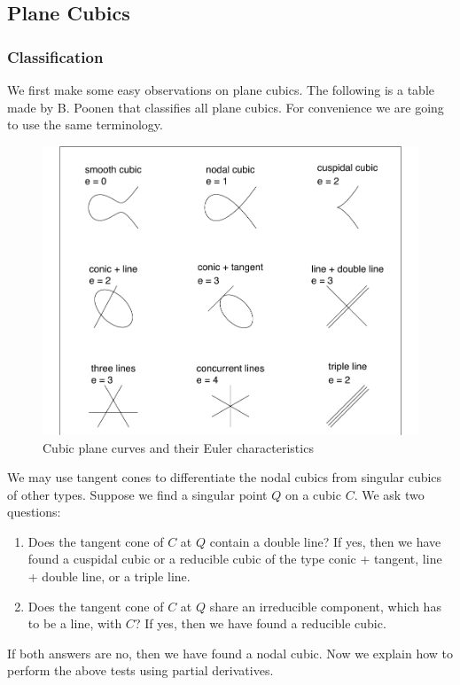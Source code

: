 \documentclass[12pt]{article}
\theoremstyle{plain}
\theoremstyle{definition}
\newcommand{\<}{\langle}
\renewcommand{\>}{\rangle}
\begin{document}
\subsection{Plane Cubics}
\subsubsection{Classification}
\label{classification}
We first make some easy observations on plane cubics. The following is a table made by B. Poonen that classifies all plane cubics. For convenience we are going to use the same terminology.

\begin{figure}[h!]
  \label{figure}
  \centering
      \includegraphics[width=1.0\textwidth]{planecubics}
  \caption{Cubic plane curves and their Euler characteristics \cite{Pic}}
\end{figure}

We may use tangent cones to differentiate the nodal cubics from singular cubics of other types. Suppose we find a singular point $Q$ on a cubic $C$. We ask two questions:
\begin{enumerate}
\item Does the tangent cone of $C$ at $Q$ contain a double line? If yes, then we have found a cuspidal cubic or a reducible cubic of the type conic + tangent, line + double line, or a triple line. 
\item Does the tangent cone of $C$ at $Q$ share an irreducible component, which has to be a line, with $C$? If yes, then we have found a reducible cubic. 
\end{enumerate}
If both answers are no, then we have found a nodal cubic. Now we explain how to perform the above tests using partial derivatives. 
\end{document}
